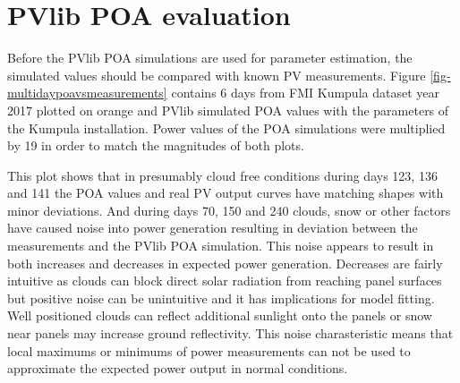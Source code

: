 

\newpage
\section{PVlib POA evaluation}
Before the PVlib POA simulations are used for parameter estimation, the simulated values should be compared with known PV measurements. Figure \ref{fig-multidaypoavsmeasurements} contains 6 days from FMI Kumpula dataset year 2017 plotted on orange and PVlib simulated POA values with the parameters of the Kumpula installation. Power values of the POA simulations were multiplied by 19 in order to match the magnitudes of both plots.

This plot shows that in presumably cloud free conditions during days 123, 136 and 141 the POA values and real PV output curves have matching shapes with minor deviations. And during days 70, 150 and 240 clouds, snow or other factors have caused noise into power generation resulting in deviation between the measurements and the PVlib POA simulation. This noise appears to result in both increases and decreases in expected power generation. Decreases are fairly intuitive as clouds can block direct solar radiation from reaching panel surfaces but positive noise can be unintuitive and it has implications for model fitting. Well positioned clouds can reflect additional sunlight onto the panels or snow near panels may increase ground reflectivity. This noise charasteristic means that local maximums or minimums of power measurements can not be used to approximate the expected power output in normal conditions. 






